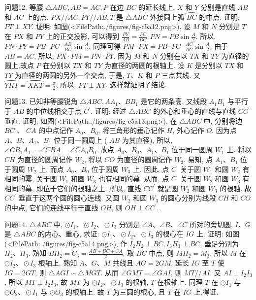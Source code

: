 问题12. 等腰 $\triangle A B C, A B=A C, P$ 在边 $B C$ 的延长线上, $X$ 和 $Y$ 分别是直线 $A B$ 和 $A C$ 上的点.
$P X / / A C, P Y / / A B, T$ 是 $\triangle A B C$ 外接圆上弧 $\overparen{B C}$ 的中点.
证明: $P T \perp X Y$.
证明: 如图(<FilePath:./figures/fig-c5a12.png>), 设 $M$ 和 $N$ 分别是 $T$ 在 $P X$ 和 $P Y$ 上的正交投影, 可以得到 $\frac{P Y}{A B}=\frac{P C}{B C}, P N=P B \sin \frac{A}{2}$. 所以, $P N \cdot P Y=P B \cdot P C \cdot \frac{A B}{B C} \sin \frac{A}{2}$. 同理可得 $P M \cdot P X=P B \cdot P C \cdot \frac{A C}{B C} \sin \frac{A}{2}$. 由于 $A B=A C$, 所以, $P X \cdot P M=P N \cdot P Y$. 因为 $M$ 和 $N$ 分别在以 $T X$ 和 $T Y$ 为直径的圆上,故点 $P$ 在分别以 $T X$ 和 $T Y$ 为直径的两圆的根轴上.
设 $K$ 是分别以 $T X$ 和 $T Y$ 为直径的两圆的另外一个交点, 于是, $T 、 K$ 和 $P$ 三点共线.
又 $\overparen{Y K T}=\overparen{X K T}=\frac{\pi}{2}$, 所以, $P T \perp X Y$. 这样就证明了结论.



问题13. 已知非等腰锐角 $\triangle A B C, A A_1 、 B B_1$ 是它的两条高, 又线段 $A_1 B_1$ 与平行于 $A B$ 的中位线相交于点 $C^{\prime}$. 证明: 经过 $\triangle A B C$ 的外心和垂心的直线与直线 $C C^{\prime}$ 垂直.
证明: 如图(<FilePath:./figures/fig-c5a13.png>), 在 $\triangle A B C$ 中, 分别将边 $B C$ 、 $C A$ 的中点记作 $A_0 、 B_0$, 将三角形的垂心记作 $H$, 外心记作 $O$. 因为点 $A 、 B 、 A_1 、 B_1$ 位于同一圆周上 ( $A B$ 为其直径), 所以, $\angle C B_1 A_1= \angle C B A=\angle C A_0 B_0$. 故点 $A_0 、 B_0 、 A_1 、 B_1$ 位于同一圆周 $W_1$ 上.
将以 $C H$ 为直径的圆周记作 $W_2$, 将以 $C O$ 为直径的圆周记作 $W_3$. 易知, 点
$A_1 、 B_1$ 位于圆周 $W_2$ 上, 而点 $A_0 、 B_0$ 位于圆周 $W_3$ 上.
因此, 点 $C^{\prime}$ 关于圆 $W_1$ 和圆 $W_2$ 有相同的幂, 关于圆 $W_1$ 和圆 $W_3$ 也有相同的幕.
从而, 点 $C^{\prime}$ 关于圆 $W_2$ 和圆 $W_3$ 有相同的幕, 即位于它们的根轴之上.
所以, 直线 $C C^{\prime}$ 就是圆 $W_2$ 和圆 $W_3$ 的根轴.
故 $C C^{\prime}$ 垂直于这两个圆的圆心连线.
又圆 $W_2$ 和圆 $W_3$ 的圆心分别为线段 $C H$ 和 $C O$ 的中点, 它们的连线平行于直线 $O H$, 则 $O H \perp C C^{\prime}$.



问题14. $\triangle A B C$ 中, $\odot I_1 、 \odot I_2 、 \odot I_3$ 分别是 $\angle A 、 \angle B 、 \angle C$ 所对的旁切圆, $I 、 G$ 是 $\triangle A B C$ 的内心、重心, 求证: $\odot I_1 、 \odot I_2 、 \odot I_3$ 的根心在 $I G$ 上.
证明: 如图(<FilePath:./figures/fig-c5a14.png>), 作 $I_2 H_2 \perp B C, I_3 H_3 \perp B C$, 垂足分别为 $H_2 、 H_3$. 熟知 $B H_2=C_3=\frac{A B+B C+C A}{2}$, 取 $B C$ 中点, 则 $M H_2=M_3$. 所以 $M$ 在 $\odot I_2 、 \odot I_3$ 根轴上.
熟知 $A 、 G 、 M$ 共线且 $A G=2 G M$. 延长 $I G$ 至 $T$ 使 $I G=2 G T$, 则 $\triangle A G I \backsim \triangle M G T$. 从而 $\angle G M T= \angle G A I$, 则 $M T / / A I$. 又 $A I \perp I_2 I_3$, 所以 $M T \perp I_2 I_3$, 故 $M T$ 为 $\odot I_2 、 \odot I_3$ 的根轴, $T$ 在根轴上.
同理 $T$ 在 $\odot I_1$ 与 $\odot O_2 、 \odot I_1$ 与 $\odot O_3$ 的根轴上.
故 $T$ 为三圆的根心, 且 $T$ 在 $I G$ 上,得证.



